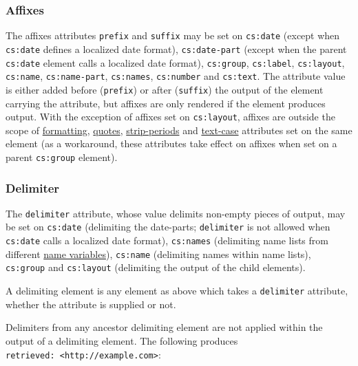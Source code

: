 \hypertarget{affixes}{%
\subsubsection{Affixes}\label{affixes}}

The affixes attributes \texttt{prefix} and \texttt{suffix} may be set on
\texttt{cs:date} (except when \texttt{cs:date} defines a localized date
format), \texttt{cs:date-part} (except when the parent \texttt{cs:date}
element calls a localized date format), \texttt{cs:group},
\texttt{cs:label}, \texttt{cs:layout}, \texttt{cs:name},
\texttt{cs:name-part}, \texttt{cs:names}, \texttt{cs:number} and
\texttt{cs:text}. The attribute value is either added before
(\texttt{prefix}) or after (\texttt{suffix}) the output of the element
carrying the attribute, but affixes are only rendered if the element
produces output. With the exception of affixes set on
\texttt{cs:layout}, affixes are outside the scope of
\protect\hyperlink{formatting}{formatting},
\protect\hyperlink{quotes}{quotes},
\protect\hyperlink{strip-periods}{strip-periods} and
\protect\hyperlink{text-case}{text-case} attributes set on the same
element (as a workaround, these attributes take effect on affixes when
set on a parent \texttt{cs:group} element).

\hypertarget{delimiter}{%
\subsubsection{Delimiter}\label{delimiter}}

The \texttt{delimiter} attribute, whose value delimits non-empty pieces
of output, may be set on \texttt{cs:date} (delimiting the date-parts;
\texttt{delimiter} is not allowed when \texttt{cs:date} calls a
localized date format), \texttt{cs:names} (delimiting name lists from
different \protect\hyperlink{name-variables}{name variables}),
\texttt{cs:name} (delimiting names within name lists), \texttt{cs:group}
and \texttt{cs:layout} (delimiting the output of the child elements).

A delimiting element is any element as above which takes a
\texttt{delimiter} attribute, whether the attribute is supplied or not.

Delimiters from any ancestor delimiting element are not applied within
the output of a delimiting element. The following produces
\texttt{retrieved:\ \textless{}http://example.com\textgreater{}}:

